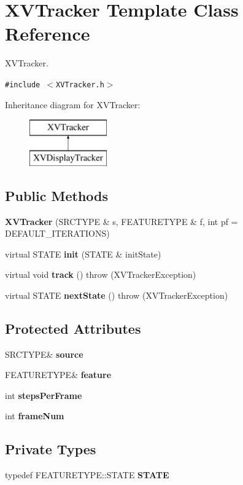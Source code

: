 \hypertarget{class_XVTracker}{
\section{XVTracker  Template Class Reference}
\label{XVTracker}
}
XVTracker. 


{\tt \#include $<$XVTracker.h$>$}

Inheritance diagram for XVTracker:\begin{figure}[H]
\begin{center}
\leavevmode
\includegraphics[height=2cm]{class_XVTracker}
\end{center}
\end{figure}
\subsection*{Public Methods}
\begin{CompactItemize}
\item 
{\bf XVTracker} (SRCTYPE \& s, FEATURETYPE \& f, int pf = DEFAULT\_\-ITERATIONS)
\item 
virtual STATE {\bf init} (STATE \& init\-State)
\item 
virtual void {\bf track} ()  throw (XVTracker\-Exception)
\item 
virtual STATE {\bf next\-State} ()  throw (XVTracker\-Exception)
\end{CompactItemize}
\subsection*{Protected Attributes}
\begin{CompactItemize}
\item 
SRCTYPE\& {\bf source}
\item 
FEATURETYPE\& {\bf feature}
\item 
int {\bf steps\-Per\-Frame}
\item 
int {\bf frame\-Num}
\end{CompactItemize}
\subsection*{Private Types}
\begin{CompactItemize}
\item 
typedef FEATURETYPE::STATE {\bf STATE}
\end{CompactItemize}


